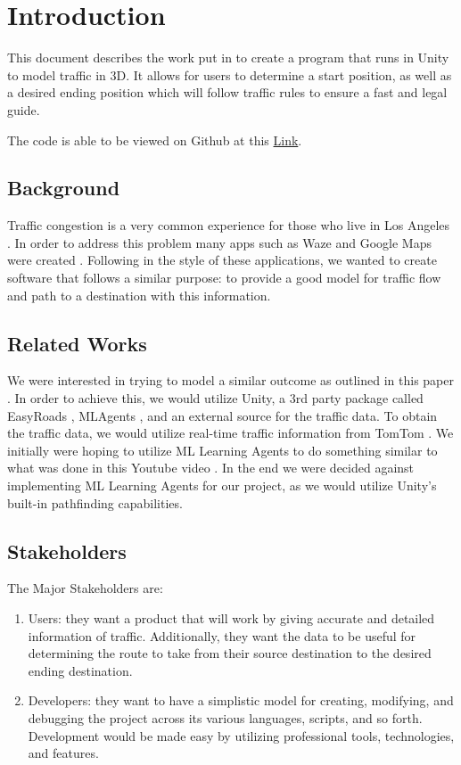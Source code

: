 \section{Introduction}

This document describes the work put in to create a program that runs in Unity to model traffic in 3D.
It allows for users to determine a start position, as well as a desired ending position which will follow traffic rules to ensure a fast and legal guide.

The code is able to be viewed on Github at this \href{https://github.com/EZRA-DVLPR/TrafficModeling}{Link}.

\subsection{Background}

Traffic congestion is a very common experience for those who live in Los Angeles \cite{CNN}.
In order to address this problem many apps such as Waze and Google Maps were created \cite{TraffApps}.
Following in the style of these applications, we wanted to create software that follows a similar purpose: to provide a good model for traffic flow and path to a destination with this information.

\subsection{Related Works}

We were interested in trying to model a similar outcome as outlined in this paper \cite{TrafficPaper}.
In order to achieve this, we would utilize Unity, a 3rd party package called EasyRoads \cite{EasyRoads}, MLAgents \cite{MLAgents}, and an external source for the traffic data.
To obtain the traffic data, we would utilize real-time traffic information from TomTom \cite{TomTom}.
We initially were hoping to utilize ML Learning Agents to do something similar to what was done in this Youtube video \cite{AITrackmania}.
In the end we were decided against implementing ML Learning Agents for our project, as we would utilize Unity's built-in pathfinding capabilities.

\newpage

\subsection{Stakeholders}

The Major Stakeholders are: 
\begin{enumerate}
    \item Users: they want a product that will work by giving accurate and detailed information of traffic.
    Additionally, they want the data to be useful for determining the route to take from their source destination to the desired ending destination.
    
    \item Developers: they want to have a simplistic model for creating, modifying, and debugging the project across its various languages, scripts, and so forth.
    Development would be made easy by utilizing professional tools, technologies, and features.
\end{enumerate}

